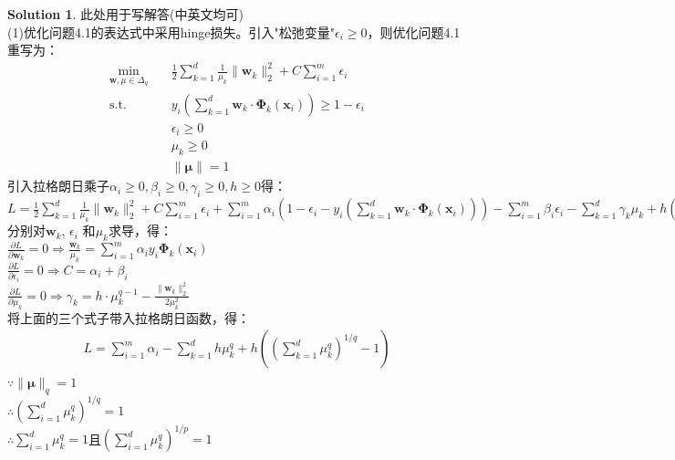 \documentclass[a4paper,UTF8]{article}
\numberwithin{equation}{section}
\theoremstyle{definition}
\newtheorem*{solution}{Solution}
\begin{document}
\begin{solution}
此处用于写解答(中英文均可)\\
(1)优化问题4.1的表达式中采用hinge损失。引入"松弛变量"$\epsilon_i \ge 0$，则优化问题4.1重写为：\\
\begin{equation}
\begin{split}
\min_{\mathbf w, \mu\in \Delta_q} &\quad \frac{1}{2} \sum_{k=1}^d \frac{1}{\mu_k}\lVert \mathbf w_k \rVert^2_2 + C\sum_{i=1}^m \epsilon_i\\
\text{s.t.} &\quad y_i(\sum_{k=1}^d  \mathbf w_k  \cdot \bm \Phi_k(\mathbf{x}_i)) \ge 1-\epsilon_i\\
&\quad \epsilon_i \ge 0\\
&\quad \mu_k \ge 0\\
&\quad \lVert \bm \mu \rVert = 1
\end{split}
\end{equation}
引入拉格朗日乘子$\alpha_i \ge 0, \beta_i \ge 0, \gamma_i \ge 0, h \ge 0$得：\\
$L = \frac{1}{2} \sum_{k=1}^d \frac{1}{\mu_k} \lVert \mathbf w_k \rVert^2_2 + C\sum_{i=1}^m \epsilon_i + \sum_{i=1}^m \alpha_i ( 1-\epsilon_i - y_i ( \sum_{k=1}^d \mathbf w_k \cdot \bm \Phi_k (\mathbf{x}_i) ) ) - \sum_{i=1}^m \beta_i \epsilon_i - \sum_{k=1}^d \gamma_k \mu_k + h(\lVert\bm\mu \rVert_q - 1)$\\
分别对$\mathbf w_k$, $\epsilon_i$ 和$\mu_k $求导，得：\\
$\frac{\partial L}{\partial \mathbf w_k} = 0 \Rightarrow \frac{\mathbf w_k}{\mu_k} = \sum_{i=1}^m \alpha_i y_i \bm\Phi_k(\mathbf{x}_i)$\\
$\frac{\partial L}{\partial \epsilon_i} = 0 \Rightarrow C = \alpha_i + \beta_i$\\
$\frac{\partial L}{\partial \mu_k} = 0 \Rightarrow \gamma_k = h \cdot \mu_k^{q-1} - \frac{\lVert \bm w_k \rVert^2_2}{2\mu_k^2}$\\
将上面的三个式子带入拉格朗日函数，得：\\
\begin{equation}
\begin{split}
L = \sum_{i=1}^m \alpha_i - \sum_{k=1}^d h \mu_k^q + h( (\sum_{k=1}^d \mu_k^q )^{1/q} - 1)\\
\end{split}
\end{equation}
$\because \lVert \bm \mu \rVert_q = 1$\\
$\therefore (\sum_{i=1}^d \mu_k^q)^{1/q} = 1$\\
$\therefore \sum_{i=1}^d \mu_k^q = 1$且$(\sum_{i=1}^d \mu_k^q)^{1/p} = 1$\\

\end{solution}
\end{document}

